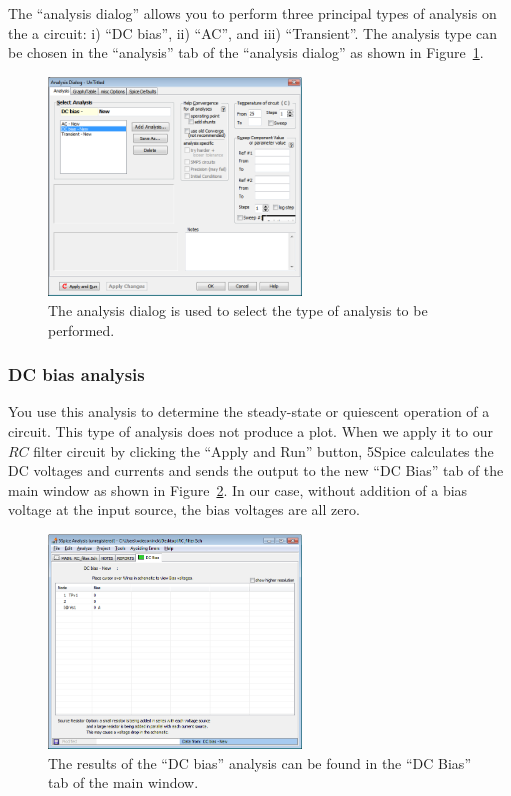 \documentclass{article}
\begin{document}
The ``analysis dialog'' allows you to perform three principal types of analysis on the a circuit: i) ``DC bias'', ii) ``AC'', and iii) ``Transient''. The analysis type can be chosen in the  ``analysis'' tab of the ``analysis dialog'' as shown in Figure~\ref{fig:5spice:select_analysis}.

\begin{figure}
\begin{center}
\includegraphics[width=0.6\textwidth]{pics/5spice_select_analysis}
\end{center}
\caption{The analysis dialog is used to select the type of analysis to be performed.}
\label{fig:5spice:select_analysis}
\end{figure}

\subsubsection{DC bias analysis}
You use this analysis to determine the steady-state or quiescent operation of a circuit. This type of analysis does not produce a plot. When we apply it to our $RC$ filter circuit by clicking the ``Apply and Run'' button, 5Spice calculates the DC voltages and currents and sends the output to the new ``DC Bias'' tab of the main window as shown in Figure~\ref{fig:5spice:DC_bias}.  In our case, without addition of a bias voltage at the input source, the bias voltages are all zero.

\begin{figure}
\begin{center}
\includegraphics[width=0.6\textwidth]{pics/5spice_DC_bias}
\end{center}
\caption{The results of the ``DC bias'' analysis can be found in the ``DC Bias'' tab of the main window.}
\label{fig:5spice:DC_bias}
\end{figure}
\end{document}
